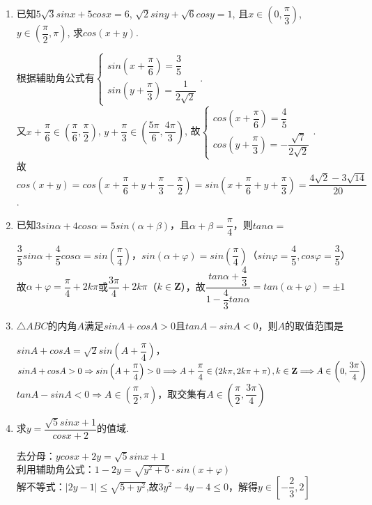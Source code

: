 \begin{enumerate}
    \item 已知$5\sqrt{3}sin{x}+5cos{x}=6$, $\sqrt{2}sin{y}+\sqrt{6}cos{y}=1$, 
    且$x\in\left(0,\dfrac{\pi}{3}\right)$, $y\in\left(\dfrac{\pi}{2},\pi\right)$, 
    求$cos(x+y)$. 
    \begin{jieda}
    根据辅助角公式有$\begin{cases}
    sin\left(x+\dfrac{\pi}{6}\right)=\dfrac{3}{5}\\
    sin\left(y+\dfrac{\pi}{3}\right)=\dfrac{1}{2\sqrt{2}}
    \end{cases}$. \\
    又$x+\dfrac{\pi}{6}\in\left(\dfrac{\pi}{6},\dfrac{\pi}{2}\right)$, $y+\dfrac{\pi}{3}\in \left(\dfrac{5\pi}{6}, \dfrac{4\pi}{3}\right)$, 
    故$\begin{cases}
    cos(x+\dfrac{\pi}{6})=\dfrac{4}{5}\\
    cos(y+\dfrac{\pi}{3})=-\dfrac{\sqrt{7}}{2\sqrt{2}}
    \end{cases}$. \\
    故$cos(x+y)=cos\left(x+\dfrac{\pi}{6}+y+\dfrac{\pi}{3}-\dfrac{\pi}{2}\right)=sin\left(x+\dfrac{\pi}{6}+y+\dfrac{\pi}{3}\right)=\dfrac{4\sqrt{2}-3\sqrt{14}}{20}$. 
    \end{jieda}
    \item 已知$3sin\alpha + 4cos\alpha = 5sin(\alpha + \beta)$，且$\alpha + \beta = \dfrac{\pi}{4}$，则$tan\alpha = $
    \begin{jieda}
        $\dfrac{3}{5}sin\alpha + \dfrac{4}{5}cos\alpha = sin(\dfrac{\pi}{4})$，$sin(\alpha + \varphi) = sin(\dfrac{\pi}{4})$（$sin\varphi = \dfrac{4}{5}, cos\varphi = \dfrac{3}{5}$）故$\alpha+\varphi = \dfrac{\pi}{4} + 2k\pi$或$\dfrac{3\pi}{4} + 2k\pi$（$k \in \mathbf{Z}$），故$ \dfrac{tan\alpha + \dfrac{4}{3}}{1-\dfrac{4}{3}tan\alpha} = tan(\alpha+\varphi) = \pm 1$
    \end{jieda}
    \item $\triangle ABC$的内角$A$满足$sinA + cosA > 0$且$tanA-sinA < 0$，则$A$的取值范围是
    \begin{jieda}
        $sinA + cosA = \sqrt{2}sin\left(A + \dfrac{\pi}{4}\right)$，$sinA + cosA > 0  \Rightarrow sin\left(A + \dfrac{\pi}{4}\right) > 0 \\
        \Longrightarrow A + \dfrac{\pi}{4} \in \left(2k\pi , 2k\pi + \pi\right), k \in \mathbf{Z} \Longrightarrow A \in \left(0, \dfrac{3\pi}{4}\right)$ \\
        $tanA-sinA < 0 \Longrightarrow A \in \left(\dfrac{\pi}{2}, \pi \right)$，取交集有$A \in \left(\dfrac{\pi}{2}, \dfrac{3\pi}{4}\right)$
    \end{jieda}
    \item 求$y = \dfrac{\sqrt{5}sinx+1}{cosx+2}$的值域.
    \begin{jieda}
        去分母：$ycosx + 2y = \sqrt{5}sinx+1$ \\
        利用辅助角公式：$1-2y = \sqrt{y^2+5} \cdot sin(x+\varphi)$ \\
        解不等式：$|2y-1| \leq \sqrt{5+y^2}$,故$3y^2-4y-4 \leq 0$，解得$y \in \left[-\dfrac{2}{3}, 2\right]$
    \end{jieda}
\end{enumerate}

